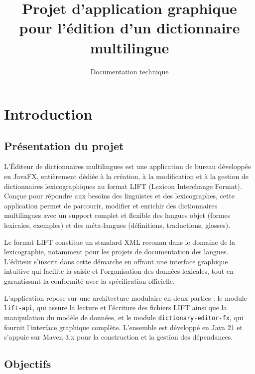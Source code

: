 \documentclass[11pt,twoside,openany]{book}
\begin{document}
\title{Projet d'application graphique pour l'édition d'un dictionnaire multilingue}
\author{}
\subtitle{Documentation technique}

\makecover

\tableofcontents
\newpage


\chapter{Introduction}

\section{Présentation du projet}

L'Éditeur de dictionnaires multilingues est une application de bureau développée en JavaFX, entièrement dédiée à la création, à la modification et à la gestion de dictionnaires lexicographiques au format LIFT (Lexicon Interchange Format). Conçue pour répondre aux besoins des linguistes et des lexicographes, cette application permet de parcourir, modifier et enrichir des dictionnaires multilingues avec un support complet et flexible des langues objet (formes lexicales, exemples) et des méta-langues (définitions, traductions, glosses).

Le format LIFT constitue un standard XML reconnu dans le domaine de la lexicographie, notamment pour les projets de documentation des langues. L'éditeur s'inscrit dans cette démarche en offrant une interface graphique intuitive qui facilite la saisie et l'organisation des données lexicales, tout en garantissant la conformité avec la spécification officielle.

L'application repose sur une architecture modulaire en deux parties : le module \texttt{lift-api}, qui assure la lecture et l'écriture des fichiers LIFT ainsi que la manipulation du modèle de données, et le module \texttt{dictionary-editor-fx}, qui fournit l'interface graphique complète. L'ensemble est développé en Java 21 et s'appuie sur Maven 3.x pour la construction et la gestion des dépendances.

\section{Objectifs}
\end{document}
